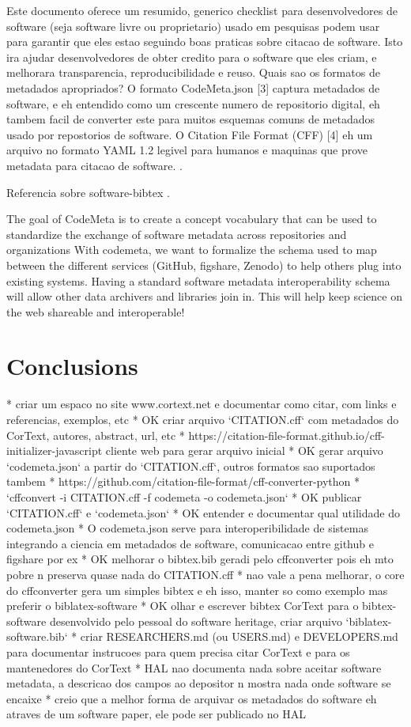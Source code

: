 \documentclass{article}
\begin{document}
Este documento oferece um resumido, generico checklist para desenvolvedores de software
(seja software livre ou proprietario) usado em pesquisas podem usar para garantir que eles
estao seguindo boas praticas sobre citacao de software. Isto ira ajudar desenvolvedores de
obter credito para o software que eles criam, e melhorara transparencia, reproducibilidade
e reuso.
Quais sao os formatos de metadados apropriados?
O formato CodeMeta.json [3]  captura metadados de software, e eh entendido como um crescente
numero de repositorio digital, eh tambem facil de converter este para muitos esquemas
comuns de metadados usado por repostorios de software.
O Citation File Format (CFF) [4] eh um arquivo no formato YAML 1.2 legivel para humanos e
maquinas que prove metadata para citacao de software.
\cite{chue_hong_software_2019}.

Referencia sobre software-bibtex \cite{softwareheritageorg_citing_2020}.

The goal of CodeMeta is to create a concept vocabulary that can be used to standardize the exchange of software metadata across repositories and organizations
With codemeta, we want to formalize the schema used to map between the different services (GitHub, figshare, Zenodo) to help others plug into existing systems. Having a standard software metadata interoperability schema will allow other data archivers and libraries join in. This will help keep science on the web shareable and interoperable!

\section{Conclusions}

* criar um espaco no site www.cortext.net e documentar como citar, com links e referencias, exemplos, etc
* OK criar arquivo `CITATION.cff` com metadados do CorText, autores, abstract, url, etc
  * https://citation-file-format.github.io/cff-initializer-javascript cliente web para gerar arquivo inicial
* OK gerar arquivo `codemeta.json` a partir do `CITATION.cff`, outros formatos sao suportados tambem
  * https://github.com/citation-file-format/cff-converter-python
  * `cffconvert -i CITATION.cff -f codemeta -o codemeta.json`
* OK publicar `CITATION.cff` e `codemeta.json`
* OK entender e documentar qual utilidade do codemeta.json
  * O codemeta.json serve para interoperibilidade de sistemas integrando a ciencia em metadados de software, comunicacao entre github e figshare por ex
* OK melhorar o bibtex.bib geradi pelo cffconverter pois eh mto pobre n preserva quase nada do CITATION.cff
  * nao vale a pena melhorar, o core do cffconverter gera um simples bibtex e eh isso, manter so como exemplo mas preferir o biblatex-software
* OK olhar e escrever bibtex CorText para o bibtex-software desenvolvido pelo pessoal do software heritage, criar arquivo `biblatex-software.bib`
* criar RESEARCHERS.md (ou USERS.md) e DEVELOPERS.md para documentar instrucoes para quem precisa citar CorText e para os mantenedores do CorText
* HAL nao documenta nada sobre aceitar software metadata, a descricao dos campos ao depositor n mostra nada onde software se encaixe
  * creio que a melhor forma de arquivar os metadados do software eh atraves de um software paper, ele pode ser publicado no HAL
\end{document}
